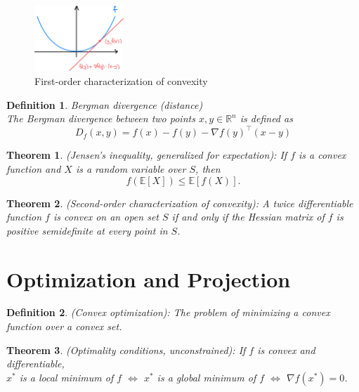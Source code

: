 \documentclass[11pt]{book} %
\newtheorem{theorem}{Theorem}[section]
\newtheorem{definition}{Definition}[section]
\begin{document}
\begin{figure}[H]
    \centering
    \includegraphics[width=0.3\textwidth]{Figs/first_order_characterization_of_convexity.png}
    \caption{First-order characterization of convexity}
\end{figure}

\begin{definition}{Bergman divergence (distance)} \\
The Bergman divergence between two points $x, y \in \mathbb{R}^n$ is defined as
\begin{equation}
    D_f(x,y) = f(x) - f(y) - \nabla f(y)^\top (x-y)
\end{equation}
\end{definition}


\begin{theorem} (Jensen’s inequality, generalized for expectation): If $f$ is a convex function and $X$ is a random variable over $S$, then
\[ f(\mathbb{E}[X]) \leq \mathbb{E}[f(X)]. \]
\end{theorem}


\begin{theorem} (Second-order characterization of convexity): A twice differentiable function $f$ is convex on an open set $S$ if and only if the Hessian matrix of $f$ is positive semidefinite at every point in $S$.
\end{theorem}

\section{Optimization and Projection}

\begin{definition} (Convex optimization): The problem of minimizing a convex function over a convex set.
\end{definition}

\begin{theorem} (Optimality conditions, unconstrained): If $f$ is convex and differentiable, \\
     $x^*$ is a local minimum of $f$ $\Leftrightarrow$ $x^*$ is a global minimum of $f$ $\Leftrightarrow$  $\nabla f(x^*) = 0$.
\end{theorem}
\end{document}

